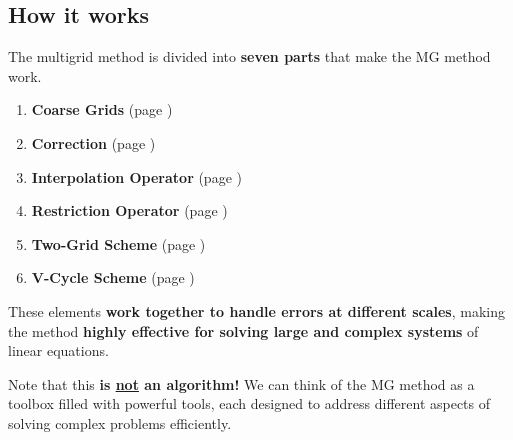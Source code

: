 \subsection{How it works}

The multigrid method is divided into \textbf{seven parts} that make the MG method work.
\begin{enumerate}
    \item \textbf{Coarse Grids} (page \pageref{subsubsection: Coarse Grids})
    \item \textbf{Correction} (page \pageref{subsubsection: Correction})
    \item \textbf{Interpolation Operator} (page \pageref{subsubsection: Interpolation Operator})
    \item \textbf{Restriction Operator} (page \pageref{subsubsection: Restriction Operator})
    \item \textbf{Two-Grid Scheme} (page \pageref{subsubsection: Two-Grid Scheme})
    \item \textbf{V-Cycle Scheme} (page \pageref{subsubsection: V-Cycle Scheme})
\end{enumerate}

\noindent
These elements \textbf{work together to handle errors at different scales}, making the method \textbf{highly effective for solving large and complex systems} of linear equations.

\highspace
Note that this \textbf{is \underline{not} an algorithm!} We can think of the MG method as a toolbox filled with powerful tools, each designed to address different aspects of solving complex problems efficiently.

